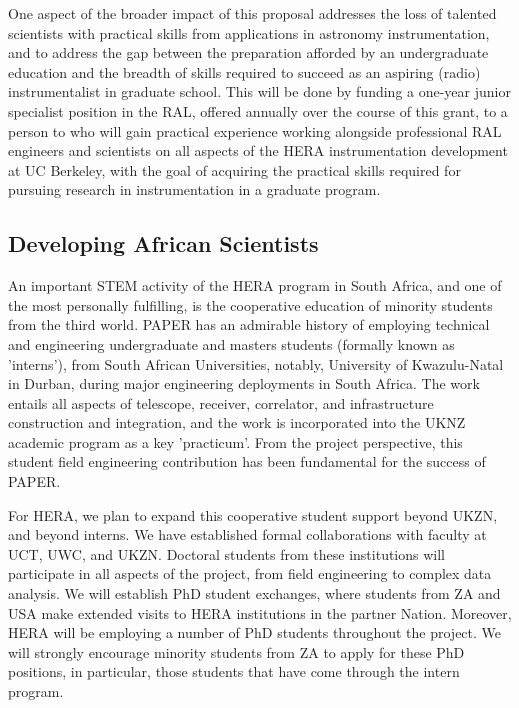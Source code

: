 \documentclass[preprint]{aastex}
\begin{document}
One aspect of the broader impact of this proposal addresses the loss of talented
scientists with practical skills from applications in astronomy
instrumentation, and to address the gap between the preparation afforded by an
undergraduate education and the breadth of skills required to succeed as an
aspiring (radio) instrumentalist in graduate school.  This will be done by
funding a one-year junior specialist position in the RAL, offered annually over the course of this grant, to a
person to who will gain practical experience working alongside professional RAL engineers and scientists
on all aspects of the HERA instrumentation development at UC Berkeley, with the goal of
acquiring the practical skills required for
pursuing research in instrumentation in a graduate program.

\subsection{Developing African Scientists}

An important STEM activity of the HERA program in South Africa, and
one of the most personally fulfilling, is the cooperative education of
minority students from the third world. PAPER has an admirable history
of employing technical and engineering undergraduate and masters
students (formally known as 'interns'), from South African
Universities, notably, University of Kwazulu-Natal in Durban, during
major engineering deployments in South Africa. The work entails all
aspects of telescope, receiver, correlator, and infrastructure construction and
integration, and the work is incorporated into the UKNZ academic
program as a key 'practicum'. From the project perspective, this
student field engineering contribution has been fundamental for the
success of PAPER.

For HERA, we plan to expand this cooperative student support beyond
UKZN, and beyond interns. We have established formal collaborations
with faculty at UCT, UWC, and UKZN. Doctoral students from these
institutions will participate in all aspects of the project, from
field engineering to complex data analysis. We will establish PhD
student exchanges, where students from ZA and USA make extended visits
to HERA institutions in the partner Nation. Moreover, HERA will be
employing a number of PhD students throughout the project. We will
strongly encourage minority students from ZA to apply for these
PhD positions, in particular, those students that have come
through the intern program.
\end{document}
